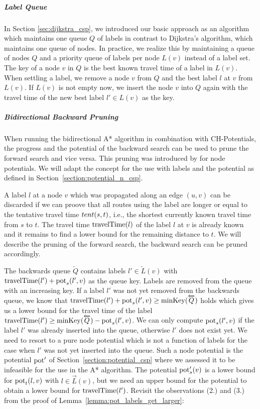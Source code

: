\subparagraph{Label Queue}
In Section \ref{sec:dijkstra_csp}, we introduced our basic approach as an algorithm which maintains one queue $Q$ of labels in contrast to Dijkstra's algorithm, which maintains one queue of nodes. In practice, we realize this by maintaining a queue of nodes $Q$ and a priority queue of labels per node $L(v)$ instead of a label set. The key of a node $v$ in $Q$ is the best known travel time of a label in $L(v)$. When settling a label, we remove a node $v$ from $Q$ and the best label $l$ at $v$ from $L(v)$. If $L(v)$ is not empty now, we insert the node $v$ into $Q$ again with the travel time of the new best label $l' \in L(v)$ as the key.

\subparagraph{Bidirectional Backward Pruning}
When running the bidirectional A* algorithm in combination with CH-Potentials, the progress and the potential of the backward search can be used to prune the forward search and vice versa. This pruning was introduced by \cite{strasser:2018} for node potentials. We will adapt the concept for the use with labels and the potential as defined in Section~\ref{section:potential_n_csp}.

A label $l$ at a node $v$ which was propagated along an edge $(u,v)$ can be discarded if we can proove that all routes using the label are longer or equal to the tentative travel time $tent(s,t)$, i.e., the shortest currently known travel time from $s$ to $t$. The travel time $\operatorname{travelTime}(l)$ of the label $l$ at $v$ is already known and it remains to find a lower bound for the remaining distance to $t$. We will describe the pruning of the forward search, the backward search can be pruned accordingly.

The backwards queue $\overleftarrow{Q}$ contains labels $l' \in \overleftarrow{L}(v)$ with $\operatorname{travelTime}(l') + \operatorname{pot}_s(l', v)$ as the queue key. Labels are removed from the queue with an increasing key. If a label $l'$ was not yet removed from the backwards queue, we know that $\operatorname{travelTime}(l') + \operatorname{pot}_s(l',v) \ge \operatorname{minKey}(\overleftarrow{Q})$ holds which gives us a lower bound for the travel time of the label $\operatorname{travelTime}(l') \ge \operatorname{minKey}(\overleftarrow{Q}) - \operatorname{pot}_s(l',v)$. We can only compute $\operatorname{pot}_s(l',v)$ if the label $l'$ was already inserted into the queue, otherwise $l'$ does not exist yet. We need to resort to a pure node potential which is not a function of labels for the case when $l'$ was not yet inserted into the queue. Such a node potential is the potential $\operatorname{pot}'$ of Section~\ref{section:potential_csp} where we assessed it to be infeasible for the use in the A* algorithm. The potential $\operatorname{pot}'_s(v)$ is a lower bound for $\operatorname{pot}_t(l,v)$ with $l \in \overrightarrow{L}(v)$, but we need an upper bound for the potential to obtain a lower bound for $\operatorname{travelTime}(l')$. Revisit the observations (2.) and (3.) from the proof of Lemma~\ref{lemma:pot_labels_get_larger}:

